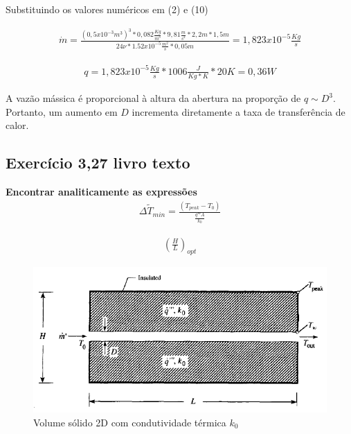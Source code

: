 \documentclass[12pt]{article}
\begin{document}
Substituindo os valores numéricos em (2) e (10)

\begin{equation}
	\begin{aligned}
		\dot{m} = \frac{{(0,5 x 10^{-3}m^{3})^3} * 0,082 \frac{Kg}{m^{3}}   *  9,81 \frac{m}{s^{2}}  *  2,2m  *  1,5 m  }{24\nu  *  1.52x 10^{-5}\frac{m^{2}}{s}  *   0,05 m} = 1,823 x 10 ^{-5} \frac{Kg}{s}
	\end{aligned}
\end{equation}

\begin{equation}
	\begin{aligned}
		q = 1,823 x 10 ^{-5} \frac{Kg}{s} * 1006 \frac{J}{Kg*K} * 20K = 0,36 W
	\end{aligned}
\end{equation}

A vazão mássica é proporcional à altura da abertura na proporção de $q \sim D^{3}$. Portanto, um aumento em $D$ incrementa diretamente a taxa de transferência de calor. 

\subsection*{Exercício 3,27	 livro texto}
\textbf{Encontrar analiticamente as expressões}\\

\begin{equation}
	\begin{aligned}
		\Delta \widetilde{T}_{min} = \frac{(T_{peak} - T_{0})}{\frac{q''' A}{k_{0}}}
	\end{aligned}
\end{equation}

\begin{equation}
	\begin{aligned}
		\left( \frac{H}{L}\right) _{opt}
	\end{aligned}
\end{equation}

\begin{figure}[H]
	\centering
	\includegraphics[width=.65\textwidth]{Figures/1_2}
	\caption{Volume sólido 2D com condutividade térmica $k_{0}$}
\end{figure}
\end{document}
